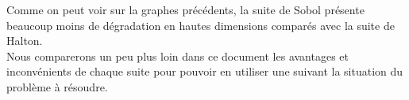 \documentclass[12pt]{report}
\begin{document}
Comme on peut voir sur la graphes précédents, la suite de Sobol présente beaucoup moins de dégradation en hautes dimensions comparés avec la suite de Halton.\\

Nous comparerons un peu plus loin dans ce document les avantages et inconvénients de chaque suite pour pouvoir en utiliser une suivant la situation du problème à résoudre.
\end{document}
